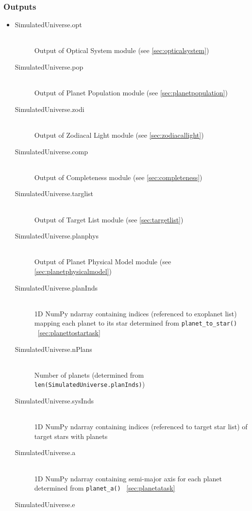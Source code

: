 \documentclass[cleanfoot]{asme2ej}
\begin{document}
\subsubsection*{Outputs}
\begin{itemize}
    \item
    \begin{description}
        \item[SimulatedUniverse.opt] \hfill \\
        Output of Optical System module (see \ref{sec:opticalsystem})
        \item[SimulatedUniverse.pop] \hfill \\
        Output of Planet Population module (see \ref{sec:planetpopulation})
        \item[SimulatedUniverse.zodi] \hfill \\
        Output of Zodiacal Light module (see \ref{sec:zodiacallight})
        \item[SimulatedUniverse.comp] \hfill \\
        Output of Completeness module (see \ref{sec:completeness})
        \item[SimulatedUniverse.targlist] \hfill \\
        Output of Target List module (see \ref{sec:targetlist})
        \item[SimulatedUniverse.planphys] \hfill \\
        Output of Planet Physical Model module (see \ref{sec:planetphysicalmodel})
        \item[SimulatedUniverse.planInds] \hfill \\
        1D NumPy ndarray containing indices (referenced to exoplanet list) mapping each planet to its star determined from \verb+planet_to_star()+ ~\ref{sec:planettostartask}
        \item[SimulatedUniverse.nPlans] \hfill \\
        Number of planets (determined from \verb+len(SimulatedUniverse.planInds)+)
        \item[SimulatedUniverse.sysInds] \hfill \\
        1D NumPy ndarray containing indices (referenced to target star list) of target stars with planets
        \item[SimulatedUniverse.a] \hfill \\
        1D NumPy ndarray containing semi-major axis for each planet determined from \verb+planet_a()+ ~\ref{sec:planetatask}
        \item[SimulatedUniverse.e] \hfill \\

\end{description}
\end{itemize}
\end{document}
